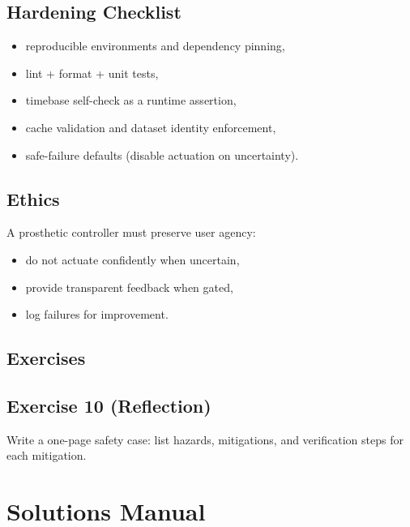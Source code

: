 \documentclass[11pt,openany]{book}
\newcommand{\exercise}[2]{%
\section*{Exercise #1}
#2
}
\begin{document}
\section{Hardening Checklist}

\begin{itemize}
\item reproducible environments and dependency pinning,
\item lint + format + unit tests,
\item timebase self-check as a runtime assertion,
\item cache validation and dataset identity enforcement,
\item safe-failure defaults (disable actuation on uncertainty).
\end{itemize}

\section{Ethics}

A prosthetic controller must preserve user agency:
\begin{itemize}
\item do not actuate confidently when uncertain,
\item provide transparent feedback when gated,
\item log failures for improvement.
\end{itemize}

\section{Exercises}

\exercise{10 (Reflection)}{
Write a one-page safety case: list hazards, mitigations, and verification steps for each mitigation.
}


\appendix

\chapter{Solutions Manual}
\end{document}
